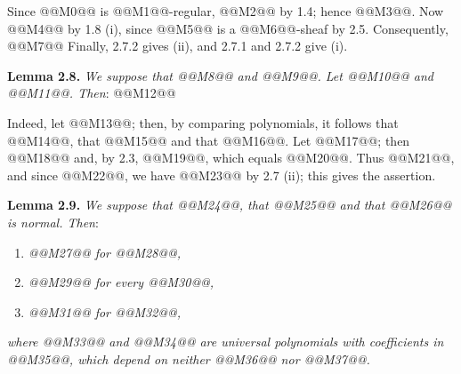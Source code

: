 Since @@M0@@ is @@M1@@-regular, @@M2@@ by 1.4; hence @@M3@@. Now @@M4@@ by 1.8 (i), since @@M5@@ is a @@M6@@-sheaf by 2.5. Consequently,
@@M7@@
Finally, 2.7.2 gives (ii), and 2.7.1 and 2.7.2 give (i).

\textbf{Lemma 2.8.} \emph{We suppose that @@M8@@ and @@M9@@. Let @@M10@@ and @@M11@@. Then}:
@@M12@@

Indeed, let @@M13@@; then, by comparing polynomials, it follows that @@M14@@, that @@M15@@ and that @@M16@@. Let @@M17@@; then @@M18@@ and, by 2.3, @@M19@@, which equals @@M20@@. Thus @@M21@@, and since @@M22@@, we have @@M23@@ by 2.7 (ii); this gives the assertion.

\textbf{Lemma 2.9.} \emph{We suppose that @@M24@@, that @@M25@@ and that @@M26@@ is normal. Then}:
\begin{enumerate}[label=(\roman*)]
\item \emph{@@M27@@ for @@M28@@,}
\item \emph{@@M29@@ for every @@M30@@,}
\item \emph{@@M31@@ for @@M32@@,}
\end{enumerate}
\emph{where @@M33@@ and @@M34@@ are universal polynomials with coefficients in @@M35@@, which depend on neither @@M36@@ nor @@M37@@.}

